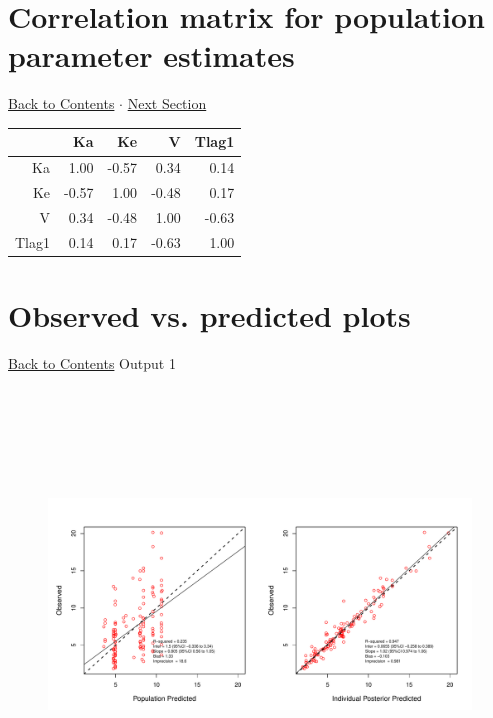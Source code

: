 \documentclass{article}
\begin{document}
          \section{Correlation matrix for population parameter estimates} 
 \hyperlink{tableofcontents}{Back to Contents} $\cdot$ \hyperlink{opp}{Next Section} \newline
          \newline 
\begin{tabular}{rrrrr}
  \hline
 & Ka & Ke & V & Tlag1 \\ 
  \hline
Ka & 1.00 & -0.57 & 0.34 & 0.14 \\ 
  Ke & -0.57 & 1.00 & -0.48 & 0.17 \\ 
  V & 0.34 & -0.48 & 1.00 & -0.63 \\ 
  Tlag1 & 0.14 & 0.17 & -0.63 & 1.00 \\ 
   \hline
\end{tabular}
\newpage
        
        \hypertarget{opp}{}
        
        \section{Observed vs. predicted plots}
        \hyperlink{tableofcontents}{Back to Contents} \newline
        \newline 
Output 1 
\begin{figure}[H] 
              \includegraphics[height=4.5in,width=8in]{op1.pdf} 
              \end{figure} 
\end{document}
